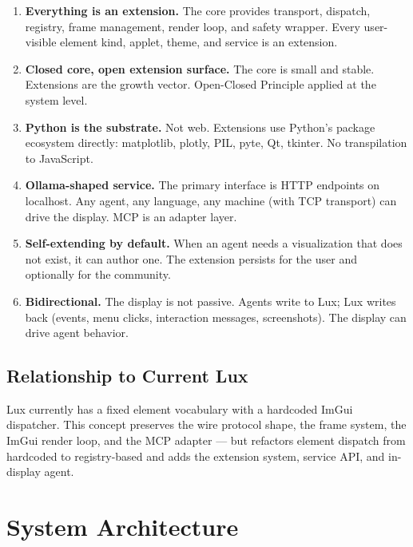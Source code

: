 \documentclass[a4paper,10pt]{article}
\begin{document}
\begin{enumerate}[label=\textbf{P\arabic*}.]
  \item \textbf{Everything is an extension.}  The core provides
    transport, dispatch, registry, frame management, render loop, and
    safety wrapper.  Every user-visible element kind, applet, theme,
    and service is an extension.
  \item \textbf{Closed core, open extension surface.}  The core is
    small and stable.  Extensions are the growth vector.  Open-Closed
    Principle applied at the system level.
  \item \textbf{Python is the substrate.}  Not web.  Extensions use
    Python's package ecosystem directly: matplotlib, plotly, PIL,
    pyte, Qt, tkinter.  No transpilation to JavaScript.
  \item \textbf{Ollama-shaped service.}  The primary interface is HTTP
    endpoints on localhost.  Any agent, any language, any machine
    (with TCP transport) can drive the display.  MCP is an adapter
    layer.
  \item \textbf{Self-extending by default.}  When an agent needs a
    visualization that does not exist, it can author one.  The
    extension persists for the user and optionally for the community.
  \item \textbf{Bidirectional.}  The display is not passive.  Agents
    write to Lux; Lux writes back (events, menu clicks, interaction
    messages, screenshots).  The display can drive agent behavior.
\end{enumerate}

\subsection{Relationship to Current Lux}

Lux currently has a fixed element vocabulary with a hardcoded ImGui
dispatcher.  This concept preserves the wire protocol shape, the
frame system, the ImGui render loop, and the MCP adapter --- but
refactors element dispatch from hardcoded to registry-based and adds
the extension system, service API, and in-display agent.

\section{System Architecture}
\end{document}
